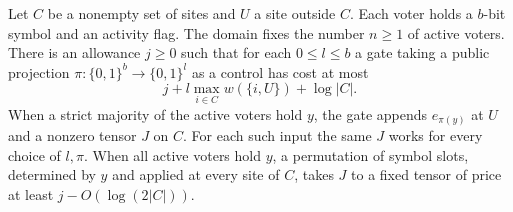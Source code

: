 \begin{lemma}\label{lem:vote}
Let \(C\) be a nonempty set of sites and \(U\) a site outside \(C\).
Each voter holds a \(b\)-bit symbol and an activity flag. The domain
fixes the number \(n\ge1\) of active voters. There is an allowance
\(j\ge0\) such that for each \(0\le l\le b\) a gate taking a public
projection \(\pi\colon\{0,1\}^b\to\{0,1\}^l\) as a control has cost at most
\[
               j+l\max_{i\in C}w(\{i,U\})+\log |C|.
\]
When a strict majority of the active voters hold \(y\), the gate
appends \(e_{\pi(y)}\) at \(U\) and a nonzero tensor \(J\) on \(C\).
For each such input the same \(J\) works for every choice of \(l,\pi\).
When all active voters hold \(y\), a permutation of symbol slots,
determined by \(y\) and applied at every site of \(C\), takes \(J\) to
a fixed tensor of price at least \(j-O(\log(2|C|))\).
\end{lemma}


